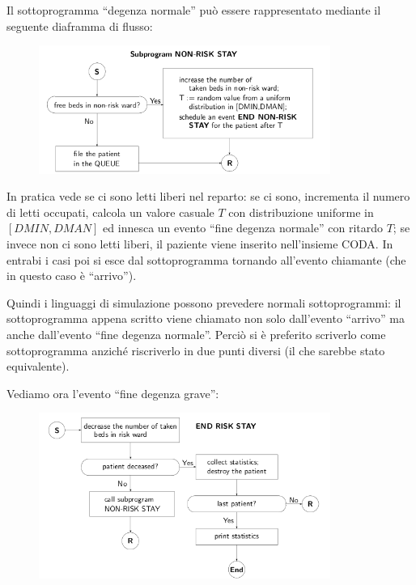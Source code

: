 \documentclass[11pt]{book}
\begin{document}
Il sottoprogramma ``degenza normale'' pu\`o essere rappresentato
mediante il seguente diaframma di flusso:

\begin{figure}[H]
  \centering
  \includegraphics[width=0.85\textwidth]{images/cap11fig19.png}
\end{figure}

In pratica vede se ci sono letti liberi nel reparto: se ci sono,
incrementa il numero di letti occupati, calcola un valore casuale $T$
con distribuzione uniforme in $[DMIN,DMAN]$ ed innesca un evento
``fine degenza normale'' con ritardo $T$; se invece non ci sono letti
liberi, il paziente viene inserito nell'insieme CODA. In entrabi i
casi poi si esce dal sottoprogramma tornando all'evento chiamante (che
in questo caso \`e ``arrivo'').

Quindi i linguaggi di simulazione possono prevedere normali
sottoprogrammi: il sottoprogramma appena scritto viene chiamato non
solo dall'evento ``arrivo'' ma anche dall'evento ``fine degenza
normale''. Perci\`o si \`e preferito scriverlo come sottoprogramma
anzich\'e riscriverlo in due punti diversi (il che sarebbe stato
equivalente). 

Vediamo ora l'evento ``fine degenza grave'':

\begin{figure}[H]
  \centering
  \includegraphics[width=0.85\textwidth]{images/cap11fig20.png}
\end{figure}
\end{document}
